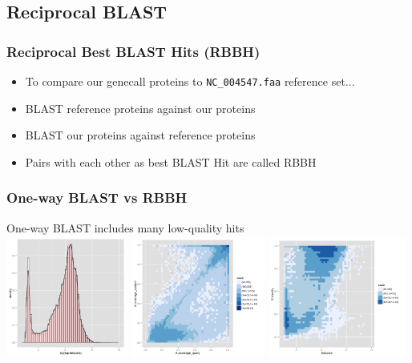 %

\subsection{Reciprocal BLAST}
\begin{frame}
  \frametitle{Reciprocal Best BLAST Hits (RBBH)}
  \begin{itemize}
    \item To compare our genecall proteins to \texttt{NC\_004547.faa} reference set...
    \item BLAST reference proteins against our proteins
    \item BLAST our proteins against reference proteins
    \item Pairs with each other as best BLAST Hit are called RBBH
  \end{itemize}
\end{frame}

\begin{frame}
  \frametitle{One-way BLAST vs RBBH}   
  One-way BLAST includes many low-quality hits \\
  \includegraphics[width=0.3\textwidth]{images/rbbh1}
  \includegraphics[width=0.33\textwidth]{images/rbbh2}
  \includegraphics[width=0.34\textwidth]{images/rbbh3}
\end{frame}

